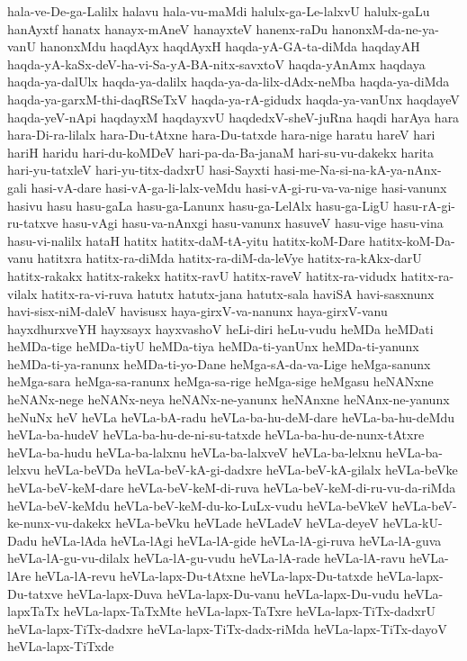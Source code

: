 {hala-ve-De-ga-Lalilx
halavu
hala-vu-maMdi
halulx-ga-Le-lalxvU
halulx-gaLu
hanAyxtf
hanatx
hanayx-mAneV
hanayxteV
hanenx-raDu
hanonxM-da-ne-ya-vanU
hanonxMdu
haqdAyx
haqdAyxH
haqda-yA-GA-ta-diMda
haqdayAH
haqda-yA-kaSx-deV-ha-vi-Sa-yA-BA-nitx-savxtoV
haqda-yAnAmx
haqdaya
haqda-ya-dalUlx
haqda-ya-dalilx
haqda-ya-da-lilx-dAdx-neMba
haqda-ya-diMda
haqda-ya-garxM-thi-daqRSeTxV
haqda-ya-rA-gidudx
haqda-ya-vanUnx
haqdayeV
haqda-yeV-nApi
haqdayxM
haqdayxvU
haqdedxV-sheV-juRna
haqdi
harAya
hara
hara-Di-ra-lilalx
hara-Du-tAtxne
hara-Du-tatxde
hara-nige
haratu
hareV
hari
hariH
haridu
hari-du-koMDeV
hari-pa-da-Ba-janaM
hari-su-vu-dakekx
harita
hari-yu-tatxleV
hari-yu-titx-dadxrU
hasi-Sayxti
hasi-me-Na-si-na-kA-ya-nAnx-gali
hasi-vA-dare
hasi-vA-ga-li-lalx-veMdu
hasi-vA-gi-ru-va-va-nige
hasi-vanunx
hasivu
hasu
hasu-gaLa
hasu-ga-Lanunx
hasu-ga-LelAlx
hasu-ga-LigU
hasu-rA-gi-ru-tatxve
hasu-vAgi
hasu-va-nAnxgi
hasu-vanunx
hasuveV
hasu-vige
hasu-vina
hasu-vi-nalilx
hataH
hatitx
hatitx-daM-tA-yitu
hatitx-koM-Dare
hatitx-koM-Da-vanu
hatitxra
hatitx-ra-diMda
hatitx-ra-diM-da-leVye
hatitx-ra-kAkx-darU
hatitx-rakakx
hatitx-rakekx
hatitx-ravU
hatitx-raveV
hatitx-ra-vidudx
hatitx-ra-vilalx
hatitx-ra-vi-ruva
hatutx
hatutx-jana
hatutx-sala
haviSA
havi-sasxnunx
havi-sisx-niM-daleV
havisusx
haya-girxV-va-nanunx
haya-girxV-vanu
hayxdhurxveYH
hayxsayx
hayxvashoV
heLi-diri
heLu-vudu
heMDa
heMDati
heMDa-tige
heMDa-tiyU
heMDa-tiya
heMDa-ti-yanUnx
heMDa-ti-yanunx
heMDa-ti-ya-ranunx
heMDa-ti-yo-Dane
heMga-sA-da-va-Lige
heMga-sanunx
heMga-sara
heMga-sa-ranunx
heMga-sa-rige
heMga-sige
heMgasu
heNANxne
heNANx-nege
heNANx-neya
heNANx-ne-yanunx
heNAnxne
heNAnx-ne-yanunx
heNuNx
heV
heVLa
heVLa-bA-radu
heVLa-ba-hu-deM-dare
heVLa-ba-hu-deMdu
heVLa-ba-hudeV
heVLa-ba-hu-de-ni-su-tatxde
heVLa-ba-hu-de-nunx-tAtxre
heVLa-ba-hudu
heVLa-ba-lalxnu
heVLa-ba-lalxveV
heVLa-ba-lelxnu
heVLa-ba-lelxvu
heVLa-beVDa
heVLa-beV-kA-gi-dadxre
heVLa-beV-kA-gilalx
heVLa-beVke
heVLa-beV-keM-dare
heVLa-beV-keM-di-ruva
heVLa-beV-keM-di-ru-vu-da-riMda
heVLa-beV-keMdu
heVLa-beV-keM-du-ko-LuLx-vudu
heVLa-beVkeV
heVLa-beV-ke-nunx-vu-dakekx
heVLa-beVku
heVLade
heVLadeV
heVLa-deyeV
heVLa-kU-Dadu
heVLa-lAda
heVLa-lAgi
heVLa-lA-gide
heVLa-lA-gi-ruva
heVLa-lA-guva
heVLa-lA-gu-vu-dilalx
heVLa-lA-gu-vudu
heVLa-lA-rade
heVLa-lA-ravu
heVLa-lAre
heVLa-lA-revu
heVLa-lapx-Du-tAtxne
heVLa-lapx-Du-tatxde
heVLa-lapx-Du-tatxve
heVLa-lapx-Duva
heVLa-lapx-Du-vanu
heVLa-lapx-Du-vudu
heVLa-lapxTaTx
heVLa-lapx-TaTxMte
heVLa-lapx-TaTxre
heVLa-lapx-TiTx-dadxrU
heVLa-lapx-TiTx-dadxre
heVLa-lapx-TiTx-dadx-riMda
heVLa-lapx-TiTx-dayoV
heVLa-lapx-TiTxde
}
